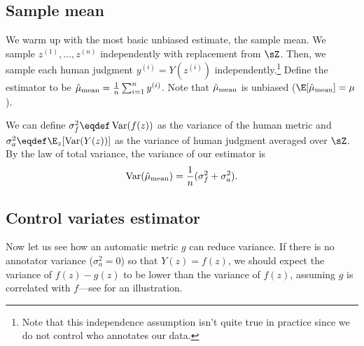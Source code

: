 
\subsection{Sample mean}

We warm up with the most basic unbiased estimate, the sample mean.
We sample $z^{(1)}, \dots, z^{(n)}$ independently with replacement from $\sZ$.
Then, we sample each human judgment $y^{(i)} = Y(z^{(i)})$ independently.\footnote{%
Note that this independence assumption isn't quite true in practice since we do not control who annotates our data.}
Define the estimator to be $\hat \mu_\text{mean} = \frac{1}{n} \sum_{i=1}^n y^{(i)}$.
Note that $\hat \mu_\text{mean}$ is unbiased ($\E[\musimple] = \mu$).

We can define $\sigma^2_f \eqdef \Var(f(z))$ as the variance of the human metric
and $\sigma^2_a \eqdef \E_z[\Var(Y(z))]$ as the variance of human judgment averaged over $\sZ$.
By the law of total variance, the variance of our estimator
is
\begin{align}
\label{eqn:varsimple}
\operatorname{Var}(\hat \mu_\text{mean}) = \frac{1}{n} (\sigma^2_f + \sigma^2_a).
\end{align}


\subsection{Control variates estimator}

Now let us see how an automatic metric $g$ can reduce variance.
If there is no annotator variance ($\sigma^2_a = 0$) so that $Y(z) = f(z)$,
we should expect the variance of $f(z)-g(z)$ to be lower than the variance of
$f(z)$, assuming $g$ is correlated with $f$---see  for an illustration.

